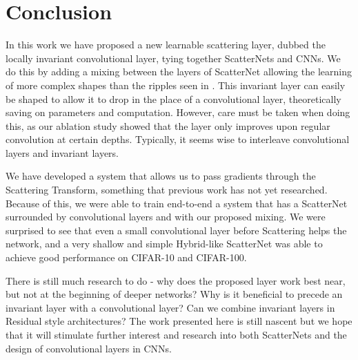 \section{Conclusion}\label{sec:conclusion}
In this work we have proposed a new learnable scattering layer, dubbed the
locally invariant convolutional layer, tying together ScatterNets and CNNs.
We do this by adding a mixing between the layers of ScatterNet allowing the
learning of more complex shapes than the ripples seen in
\cite{cotter_visualizing_2017}. This invariant layer can easily be shaped to allow
it to drop in the place of a convolutional layer, theoretically saving on parameters and
computation. However, care must be taken when doing this, as our ablation study
showed that the layer only improves upon regular convolution at certain depths.
Typically, it seems wise to interleave convolutional layers and invariant
layers.

We have developed a system that allows us to pass
gradients through the Scattering Transform, something that previous work has not
yet researched. Because of this, we were able to train end-to-end a system that
has a ScatterNet surrounded by convolutional layers and with our proposed mixing. 
We were surprised to see that even a small
convolutional layer before Scattering helps the network, and a
very shallow and simple Hybrid-like ScatterNet was able to achieve good
performance on CIFAR-10 and CIFAR-100.

There is still much research to do - why does the proposed layer work best near,
but not at the beginning of deeper networks? Why is it beneficial to precede an
invariant layer with a convolutional layer? Can we combine invariant layers in
Residual style architectures? The work presented here is still
nascent but we hope that it will stimulate further interest and research into both
ScatterNets and the design of convolutional layers in CNNs.

